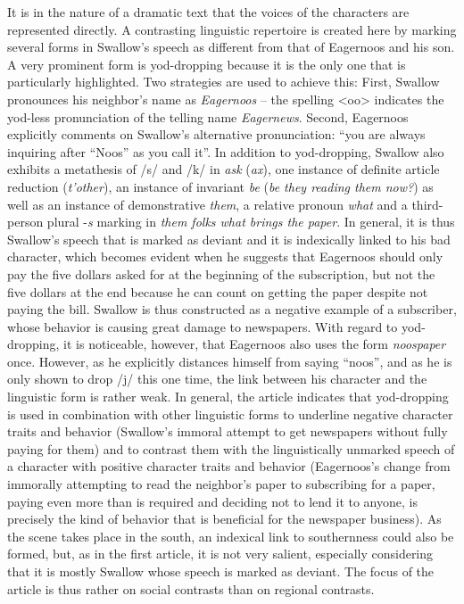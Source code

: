 It is in the nature of a dramatic text that the voices of the characters are represented directly. A contrasting linguistic repertoire is created here by marking several forms in Swallow’s speech as different from that of Eagernoos and his son. A very prominent form is yod-dropping because it is the only one that is particularly highlighted. Two strategies are used to achieve this: First, Swallow pronounces his neighbor’s name as \emph{Eagernoos} – the spelling <oo> indicates the yod-less pronunciation of the telling name \emph{Eagernews}. Second, Eagernoos explicitly comments on Swallow’s alternative pronunciation: “you are always inquiring after “Noos” as you call it”. In addition to yod-dropping, Swallow also exhibits a metathesis of /s/ and /k/ in \emph{ask} (\emph{ax}), one instance of definite article reduction (\emph{t’other}), an instance of invariant \emph{be} (\emph{be they reading them now?}) as well as an instance of demonstrative \emph{them}, a relative pronoun \emph{what} and a third-person plural -\emph{s} marking in \emph{them folks what brings the paper}. In general, it is thus Swallow’s speech that is marked as deviant and it is indexically linked to his bad character, which becomes evident when he suggests that Eagernoos should only pay the five dollars asked for at the beginning of the subscription, but not the five dollars at the end because he can count on getting the paper despite not paying the bill. Swallow is thus constructed as a negative example of a subscriber, whose behavior is causing great damage to newspapers. With regard to yod-dropping, it is noticeable, however, that Eagernoos also uses the form \emph{noospaper} once. However, as he explicitly distances himself from saying “noos”, and as he is only shown to drop /j/ this one time, the link between his character and the linguistic form is rather weak. In general, the article indicates that yod-dropping is used in combination with other linguistic forms to underline negative character traits and behavior (Swallow’s immoral attempt to get newspapers without fully paying for them) and to contrast them with the linguistically unmarked speech of a character with positive character traits and behavior (Eagernoos’s change from immorally attempting to read the neighbor’s paper to subscribing for a paper, paying even more than is required and deciding not to lend it to anyone, is precisely the kind of behavior that is beneficial for the newspaper business). As the scene takes place in the south, an indexical link to southernness could also be formed, but, as in the first article, it is not very salient, especially considering that it is mostly Swallow whose speech is marked as deviant. The focus of the article is thus rather on social contrasts than on regional contrasts.

